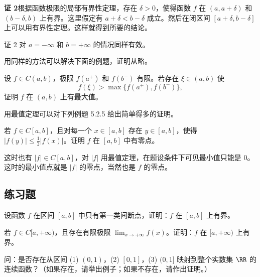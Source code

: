 \begin{xproof}
\textbf{证 2}\quad 根据函数极限的局部有界性定理，存在 $\delta>0$，使得函数 $f$ 在 $(a,a+\delta)$ 和 $(b-\delta,b)$ 上有界。这里假定有 $a+\delta<b-\delta$ 成立。然后在闭区间 $[a+\delta,b-\delta]$ 上可以用有界性定理。这样就得到所要的结论。
\end{xproof}

\begin{xremark}
证 2 对 $a=-\infty$ 和 $b=+\infty$ 的情况同样有效。
\end{xremark}

用同样的方法可以解决下面的例题，证明从略。

\begin{xexample}[5.3.4]
设 $f\in C(a,b)$，极限 $f(a^+)$ 和 $f(b^-)$ 有限。若存在 $\xi\in(a,b)$ 使
\[
  f(\xi)>\max\{f(a^+),f(b^-)\},
\]
证明 $f$ 在 $(a,b)$ 上有最大值。
\end{xexample}

用最值定理可以对下列例题 5.2.5 给出简单得多的证明。

\begin{xexample}[5.3.5]
若 $f\in C[a,b]$，且对每一个 $x\in[a,b]$ 存在 $y\in[a,b]$，使得 $|f(y)|\le\frac12|f(x)|$。证明 $f$ 在 $[a,b]$ 中有零点。
\end{xexample}
\begin{xproof}
这时也有 $|f|\in C[a,b]$，对 $|f|$ 用最值定理，在题设条件下可见最小值只能是 0。这时的最小值点就是 $|f|$ 的零点，当然也是 $f$ 的零点。
\end{xproof}

\subsection{练习题}

\begin{xexercise}[1]
设函数 $f$ 在区间 $[a,b]$ 中只有第一类间断点，证明：$f$ 在 $[a,b]$ 上有界。
\end{xexercise}

\begin{xexercise}[2]
若 $f\in C[a,+\infty)$，且存在有限极限 $\lim_{x\to+\infty}f(x)$。证明：$f$ 在 $[a,+\infty)$ 上有界。
\end{xexercise}

\begin{xexercise}[3]
问：是否存在从区间 (1) $(0,1)$，(2) $[0,1]$，(3) $(0,1]$ 映射到整个实数集 $\RR$ 的连续函数？（如果存在，请举出例子；如果不存在，请作出证明。）
\end{xexercise}

